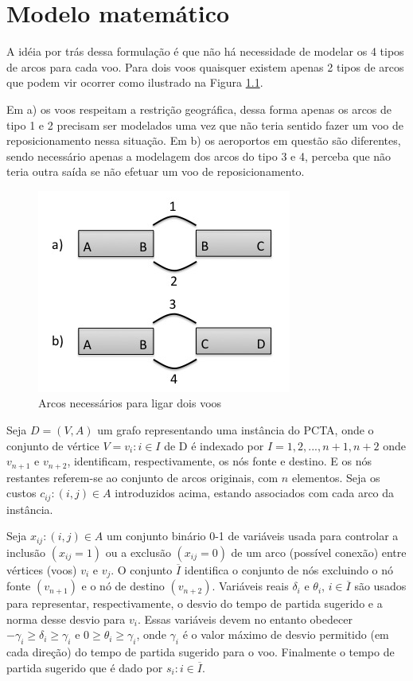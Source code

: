   \chapter{Modelo matemático}\label{cap:modelomat}
  
A idéia por trás dessa formulação é que não há necessidade de modelar os 4 tipos de arcos para cada voo. Para dois voos quaisquer existem apenas 2 tipos de arcos que podem vir ocorrer como ilustrado na Figura \ref{fig:modelagem_arcos}. 

Em a) os voos respeitam a restrição geográfica, dessa forma apenas os arcos de tipo 1 e 2 precisam ser modelados uma vez que não teria sentido fazer um voo de reposicionamento nessa situação. Em b) os aeroportos em questão são diferentes, sendo necessário apenas a modelagem dos arcos do tipo 3 e 4, perceba que não teria outra saída se não efetuar um voo de reposicionamento.  

\begin{figure}[ht]
	\centering
	\includegraphics[scale=0.4]{./img/modelagem_arcos}
	\caption{Arcos necessários para ligar dois voos}\label{fig:modelagem_arcos}
\end{figure}

Seja $D = (V,A)$ um grafo representando uma instância do PCTA, onde o conjunto de vértice $V = {v_{i}:i \in I}$ de D é indexado por $I = {1, 2, ..., n+1, n+2}$ onde $v_{n+1}$ e $v_{n+2}$, identificam, respectivamente, os nós fonte e destino. E os nós restantes referem-se ao conjunto de arcos originais, com $n$ elementos. Seja os custos ${c_{ij}:(i,j) \in A}$ introduzidos acima, estando associados com cada arco da instância.
  
Seja ${x_{ij}:(i,j) \in A}$ um conjunto binário 0-1 de variáveis usada para controlar a inclusão $(x_{ij} = 1)$ ou a exclusão $(x_{ij} = 0)$ de um arco (possível conexão) entre vértices (voos) $v_{i}$ e $v_{j}$. O conjunto $\overline{I}$ identifica o conjunto de nós excluindo o nó fonte $(v_{n+1})$ e o nó de destino $(v_{n+2})$. Variáveis reais $\delta_{i}$ e $\theta_{i}$, $i \in \overline{I}$ são usados para representar, respectivamente, o desvio do tempo de partida sugerido e a norma desse desvio para $v_{i}$. Essas variáveis devem no entanto obedecer $-\gamma_{i} \geq \delta_{i} \geq \gamma_{i}$ e $0 \geq \theta_{i} \geq \gamma_{i}$, onde $\gamma_{i}$ é o valor máximo de desvio permitido (em cada direção) do tempo de partida sugerido para o voo. Finalmente o tempo de partida sugerido que é dado por $s_{i}:i \in \overline{I}$.
  
